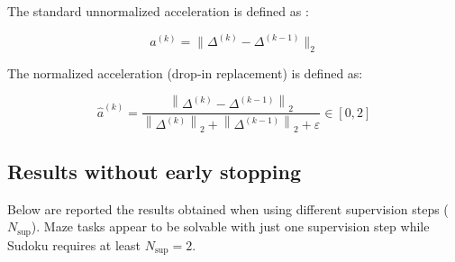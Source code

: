 \documentclass{article}
\begin{document}
The standard unnormalized acceleration is defined as :

\begin{equation}
    \label{eq:acceleration}
    a^{(k)} = \big\lVert \Delta^{(k)} - \Delta^{(k-1)} \big\rVert_2
\end{equation}

The normalized acceleration (drop-in replacement) is defined as:

\begin{equation}
    \label{eq:norm-acceleration}
    \hat{a}^{(k)} = \frac{\left\|\Delta^{(k)} - \Delta^{(k-1)}\right\|_{2}}
    {\left\|\Delta^{(k)}\right\|_{2} + \left\|\Delta^{(k-1)}\right\|_{2} + \varepsilon}
    \in [0,2]
\end{equation}


\subsection*{Results without early stopping}

Below are reported the results obtained when using different supervision steps ($N_{\mathrm{sup}}$). Maze tasks appear to be
solvable with just one supervision step while Sudoku requires at least $N_{\mathrm{sup}} = 2$.
\end{document}
